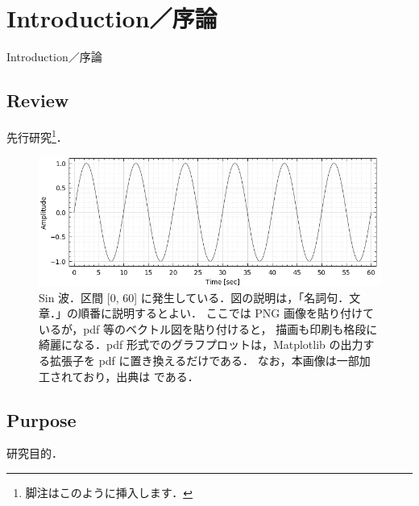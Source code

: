 \chapter{Introduction／序論}
\label{chap_Introduction}

Introduction／序論

\section{Review}
先行研究\footnote{脚注はこのように挿入します．}．

\begin{figure} %
  \centering
  \includegraphics[width=15cm]{./figs/sin.png}
  \caption{
    Sin 波．区間 [0, 60] に発生している．図の説明は，「名詞句．文章．」の順番に説明するとよい．
    ここでは PNG 画像を貼り付けているが，pdf 等のベクトル図を貼り付けると，
    描画も印刷も格段に綺麗になる．pdf 形式でのグラフプロットは，Matplotlib の出力する拡張子を pdf に置き換えるだけである．
    なお，本画像は一部加工されており，出典は \citep{ADMIS2018} である．
  }
  \label{fig_ADMIS2018}
\end{figure}

\section{Purpose}
研究目的．

